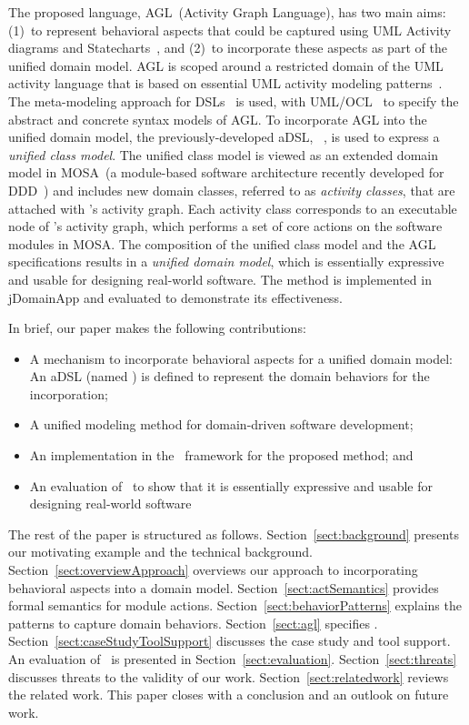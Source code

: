 The proposed language, AGL~(Activity Graph Language), has two main aims: (1)~to represent behavioral aspects that could be captured using UML Activity diagrams and Statecharts~\cite{omg_unified_2017}, and (2)~to incorporate these aspects as part of the unified domain model. AGL is scoped around a restricted domain of the UML activity language that is based on essential UML activity modeling patterns~\cite[p. 373 ]{omg_unified_2017}. The meta-modeling approach for DSLs~\cite{kleppe_software_2008} is used, with UML/OCL~\cite{omg_unified_2017, omg_object_2014} to specify the abstract and concrete syntax models of AGL. 
%
To incorporate AGL into the unified domain model, the previously-developed aDSL, \dcsl~\cite{le_domain_2018}, is used to express a \textit{unified class model}. The unified class model is viewed as an extended domain model in MOSA~(a module-based software architecture recently developed for DDD~\cite{le_generative_2018}) and includes new domain classes, referred to as \textit{activity classes}, that are attached with \agl's activity graph. Each activity class corresponds to an executable node of \agl's activity graph, which performs a set of core actions on the software modules in MOSA.
%
The composition of the unified class model and the AGL specifications results in a \textit{unified domain model}, which is essentially expressive and usable for designing real-world software. The method is implemented in jDomainApp and evaluated to demonstrate its effectiveness.

In brief, our paper makes the following contributions:
%
\begin{itemize}[leftmargin=*]
	\item A mechanism to incorporate behavioral aspects for a unified domain model: An aDSL (named \agl) is defined to represent the domain behaviors for the incorporation;
	\item A unified modeling method for domain-driven software development;
	\item An implementation in the \jdomainapp~framework for the proposed method; and
	\item An evaluation of \agl~to show that it is essentially expressive and usable for designing real-world software
\end{itemize}

The rest of the paper is structured as follows. Section~\ref{sect:background} presents our motivating example and the technical background. 
Section~\ref{sect:overviewApproach} overviews our approach to incorporating behavioral aspects into a domain model. 
Section~\ref{sect:actSemantics} provides formal semantics for module actions. Section~\ref{sect:behaviorPatterns} explains the patterns to capture domain behaviors.  
Section~\ref{sect:agl} specifies \agl. 
Section~\ref{sect:caseStudyToolSupport} discusses the case study \orderman and tool support.
An evaluation of \agl~is presented in Section~\ref{sect:evaluation}. Section~\ref{sect:threats} discusses threats to the validity of our work.
Section~\ref{sect:relatedwork} reviews the related work. This paper closes with a conclusion and an outlook on future work.
